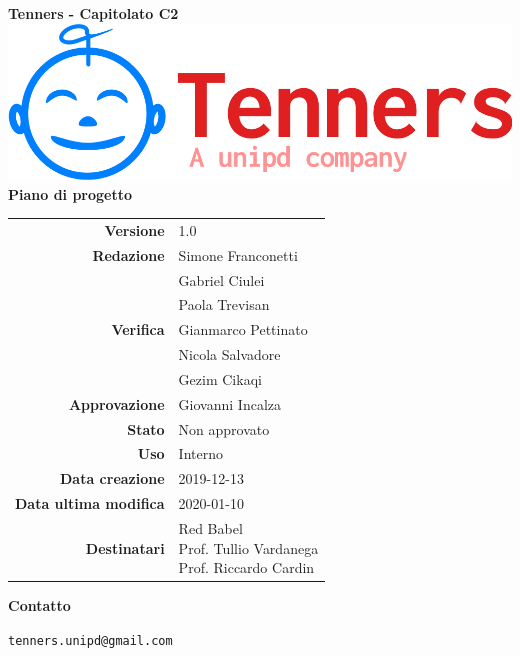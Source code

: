 \begin{titlepage}
	\begin{center}
		\large \textbf{Tenners - Capitolato C2}
		\vfill
		\includegraphics[scale = 0.3]{./res/img/logo.png}\\
		\vfill
		\Huge \textbf{Piano di progetto}

        \vfill
        \large

        \begin{tabular}{r|l}
                        \textbf{Versione} & 1.0 \\
                        \textbf{Redazione} &
                        Simone Franconetti\\&
                        Gabriel Ciulei\\&
												Paola Trevisan\\
                        \textbf{Verifica} &
                        Gianmarco Pettinato \\&
                        Nicola Salvadore \\&
												Gezim Cikaqi\\
                        \textbf{Approvazione} & Giovanni Incalza\\
                        \textbf{Stato} & Non approvato \\
                        \textbf{Uso} &  Interno\\
                        \textbf{Data creazione} &  2019-12-13\\
                        \textbf{Data ultima modifica} &  2020-01-10\\
                        \textbf{Destinatari} & \parbox[t]{5cm}{Red Babel\\Prof. Tullio Vardanega\\Prof. Riccardo Cardin}
                \end{tabular}
                \vfill
                \normalsize
                \vfill
                \textbf{Contatto}

                \texttt{tenners.unipd@gmail.com}

	\end{center}
\end{titlepage}
